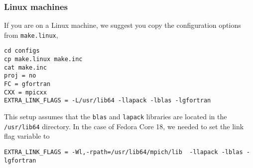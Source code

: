 \documentclass[11pt]{article}
\begin{document}
\subsubsection{Linux machines}
If you are on a Linux machine, we suggest you copy the configuration options from \verb+make.linux+,
\begin{verbatim}
cd configs
cp make.linux make.inc
cat make.inc
proj = no
FC = gfortran
CXX = mpicxx
EXTRA_LINK_FLAGS = -L/usr/lib64 -llapack -lblas -lgfortran
\end{verbatim}
This setup assumes that the \verb+blas+ and \verb+lapack+ libraries are located in the
\verb+/usr/lib64+ directory. 
In the case of Fedora Core 18, we needed to set the link flag variable to
\begin{verbatim}
EXTRA_LINK_FLAGS = -Wl,-rpath=/usr/lib64/mpich/lib  -llapack -lblas -lgfortran
\end{verbatim}
\end{document}
